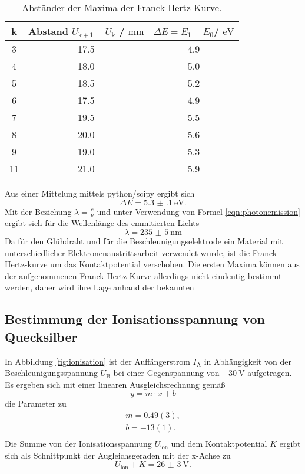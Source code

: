 \begin{table}
	\centering
	\caption{Abständer der Maxima der Franck-Hertz-Kurve.}
	\label{tab:hertzchen}
	\begin{tabular}{ccc}
		\toprule
		k& Abstand $U_{\mathrm{k+1}}-U_{\mathrm{k}}$ / $\si{\milli\meter}$ & $\Delta E=E_1 - E_0$/ $\si{\electronvolt}$ \\
		\midrule
3&17.5 & 4.9\\
4&18.0 & 5.0\\
5&18.5 & 5.2\\
6&17.5 & 4.9\\
7&19.5 & 5.5\\
8&20.0 & 5.6\\
9&19.0 & 5.3\\
11&21.0 & 5.9\\
\end{tabular}
\end{table}

Aus einer Mittelung mittels python/scipy \cite{scipy} ergibt sich
\begin{equation}
	\Delta E=\SI{5.3(1)}{\electronvolt} \mathrm{.}
\end{equation}
Mit der Beziehung $\lambda=\frac{c}{\nu}$ und unter Verwendung von Formel
\eqref{eqn:photonemission} ergibt sich für die Wellenlänge des emmitierten Lichts
\begin{equation}
	\lambda=\SI{235(5)}{\nano\meter}
\end{equation}
Da für den Glühdraht und für die Beschleunigungselektrode ein Material mit unterschiedlicher Elektronenaustrittsarbeit verwendet wurde, ist die Franck-Hertz-kurve um das Kontaktpotential verschoben.
Die ersten Maxima können aus der aufgenommenen Franck-Hertz-Kurve allerdings nicht eindeutig bestimmt werden, daher wird ihre Lage anhand der bekannten

\FloatBarrier
\subsection{Bestimmung der Ionisationsspannung von Quecksilber}
In Abbildung \ref{fig:ionisation} ist der Auffängerstrom $I_{\mathrm{A}}$ in Abhängigkeit
von der Beschleunigungsspannung $U_{\mathrm{B}}$ bei einer Gegenspannung von $-\SI{30}{\volt}$
aufgetragen.
Es ergeben sich mit einer linearen Ausgleichsrechnung gemäß
\begin{equation*}
	y = m \cdot x + b
\end{equation*}
die Parameter zu
\begin{gather*}
	m = 0.49(3) \mathrm{,} \\
	b = -13(1) \mathrm{.}  \\
\end{gather*}
Die Summe von der Ionisationsspannung $U_{\mathrm{ion}}$ und dem Kontaktpotential $K$ ergibt 
sich als Schnittpunkt der Augleichsgeraden mit der x-Achse zu
\begin{equation*}
	U_{\mathrm{ion}} + K = \SI{26(3)}{\volt} \mathrm{.}
\end{equation*}
